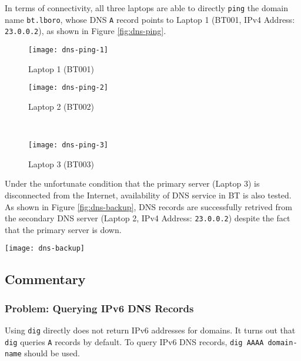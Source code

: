 In terms of connectivity, all three laptops are able to directly \texttt{ping} the domain name \texttt{bt.lboro}, whose DNS \texttt{A} record points to Laptop 1 (BT001, IPv4 Address: \texttt{23.0.0.2}), as shown in Figure \ref{fig:dns-ping}.

\begin{figure*}[ht!]
    \centering
    \begin{subfigure}[b]{0.67\textwidth}
        \centering
        \texttt{[image: dns-ping-1]}
        \caption{Laptop 1 (BT001)}
    \end{subfigure}
    \hfill
    \begin{minipage}[b]{0.3\textwidth}
	    \begin{subfigure}[b]{\linewidth}
	        \centering
	        \texttt{[image: dns-ping-2]}
	        \caption{Laptop 2 (BT002)}
	    \end{subfigure}
	    \\
	    \begin{subfigure}[b]{\linewidth}
	        \centering
	        \texttt{[image: dns-ping-3]}
	        \caption{Laptop 3 (BT003)}
	    \end{subfigure}
	\end{minipage}
    \caption{Connectivity to \texttt{bt.lboro} using \texttt{ping} on all $3$ Laptops.}
    \label{fig:dns-ping}
\end{figure*}


\clearpage


Under the unfortunate condition that the primary server (Laptop 3) is disconnected from the Internet, availability of DNS service in BT is also tested. As shown in Figure \ref{fig:dns-backup}, DNS records are successfully retrived from the secondary DNS server (Laptop 2, IPv4 Address: \texttt{23.0.0.2}) despite the fact that the primary server is down.


\begin{figure*}[ht!]
    \centering
    \texttt{[image: dns-backup]}
    \caption{Querying DNS Records for \texttt{bt.lboro} on Laptop 2 When Primary DNS Server (Laptop 3) Is Down.}
    \label{fig:dns-backup}
\end{figure*}


\subsection{Commentary}


\subsubsection{Problem: Querying IPv6 DNS Records}
Using \texttt{dig} directly does not return IPv6 addresses for domains. It turns out that \texttt{dig} queries \texttt{A} records by default. To query IPv6 DNS records, \texttt{dig AAAA domain-name} should be used.

